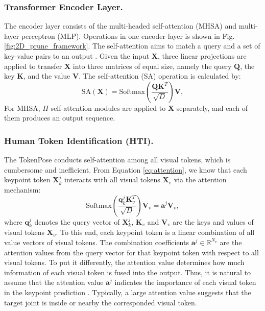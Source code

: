 \documentclass[runningheads]{llncs}
\begin{document}
\subsubsection{Transformer Encoder Layer. }
The encoder layer consists of the multi-headed self-attention (MHSA) and multi-layer perceptron (MLP). Operations in one encoder layer is shown in Fig. \ref{fig:2D_prune_framework}.
The self-attention  aims to match a query and a set of key-value pairs to an output \cite{vaswani2017attention}. 
Given the input $\mathbf{X}$, three linear projections are applied to transfer $\mathbf{X}$ into three matrices of equal size, namely the query $\mathbf{Q}$, the key $\mathbf{K}$, and the value $\mathbf{V}$.  
 The self-attention (SA) operation is calculated by:
\begin{equation}
  \text{SA}(\mathbf{X}) =  \text{Softmax}( \frac{ \mathbf{Q} \mathbf{K}^T }{\sqrt{D}}  )\mathbf{V},
  \label{eq:attention}
\end{equation}
For MHSA, $H$ self-attention modules are applied to $\mathbf{X}$ separately, and each of them produces an output sequence. 





\subsubsection{Human Token Identification (HTI). }
The TokenPose \cite{li2021tokenpose} conducts self-attention among all visual tokens, which is cumbersome and inefficient. 
From Equation \ref{eq:attention}, we know that each keypoint token $\mathbf{X}_k^j$ interacts with all visual tokens $\mathbf{X}_v$ via the attention mechanism: 
\begin{equation}
    \text{Softmax} (\frac{ \mathbf{q}_k^j \mathbf{K}_v^T }{\sqrt{D}}) \mathbf{V}_v = \mathbf{a}^j \mathbf{V}_v,
\end{equation}
where $ \mathbf{q}_k^j$ denotes the query vector of $\mathbf{X}_k^j$, $\mathbf{K}_v$ and $\mathbf{V}_v$ are the keys and values of visual tokens $\mathbf{X}_v$. 
To this end, each keypoint token is a linear combination of all value vectors of visual tokens. The combination coefficients $\mathbf{a}^j \in \mathbb{R}^{N_v}$ are the attention values from the query vector for that keypoint token with respect to all visual tokens. 
To put it differently, the attention value determines how much information of each visual token is fused into the output. 
Thus, it is natural to assume that the attention value $\mathbf{a}^j$ indicates the importance of each visual token in the keypoint prediction \cite{liang2022evit}. Typically, a large attention value suggests that the target joint is inside or nearby the corresponded visual token. 
\end{document}
